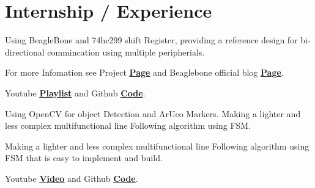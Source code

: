 \documentclass[]{font}
\begin{document}
\hfill
\begin{minipage}[t]{0.69\textwidth} 


\section{Internship / Experience}
\vspace{\topsep} %

\vspace{\topsep} %
\begin{tightemize}
\item Using BeagleBone and 74hc299 shift Register, providing a reference design for bi-directional commincation using multiple peripherials.
\item For more Infomation see Project \textbf{\href{https://elinux.org/Beagleboard_gsoc_2019_bi-directional_progress}{\underline{Page}}} and Beaglebone official blog \textbf{\href{https://beagleboard.org/blog/2019-06-02-beagleboard-org-community-kicks-off-gsoc-2019-with-four-projects}{\underline{Page}}}.
\item Youtube \textbf{\href{https://www.youtube.com/watch?v=ZZDT6jNslqw&list=PLttoix_9Us2yHM4zNr08ynm4iwXZTgxam}{\underline{Playlist}}} and Github \textbf{\href{https://github.com/pranav083/pocket_beagle-work}{\underline{Code}}}. 
\end{tightemize}
\sectionsep


\begin{tightemize}
\item Using OpenCV for object Detection and ArUco Markers. Making a lighter and less complex multifunctional line Following algorithm using FSM.
\item Making a lighter and less complex multifunctional line Following algorithm
using​ ​ FSM​ that is easy to implement and build.
\item Youtube \textbf{\href{https://youtu.be/FhUvQlrLWxc}{\underline{Video}}} and Github \textbf{\href{https://github.com/pranav083/FSM_code}{\underline{Code}}}. 
\end{tightemize}
\sectionsep



\end{minipage}
\end{document}
